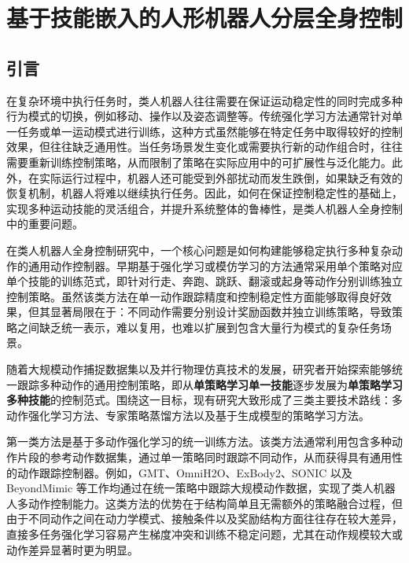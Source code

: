 
\chapter{基于技能嵌入的人形机器人分层全身控制}


\section{引言}
在复杂环境中执行任务时，类人机器人往往需要在保证运动稳定性的同时完成多种行为模式的切换，例如移动、操作以及姿态调整等。传统强化学习方法通常针对单一任务或单一运动模式进行训练，这种方式虽然能够在特定任务中取得较好的控制效果，但往往缺乏通用性\cite{duan2016benchmarking,heess2017emergence}。当任务场景发生变化或需要执行新的动作组合时，往往需要重新训练控制策略，从而限制了策略在实际应用中的可扩展性与泛化能力\cite{rusu2016progressive,hausman2018learning}。此外，在实际运行过程中，机器人还可能受到外部扰动而发生跌倒，如果缺乏有效的恢复机制，机器人将难以继续执行任务\cite{stephens2011push,fallon2015architecture}。因此，如何在保证控制稳定性的基础上，实现多种运动技能的灵活组合，并提升系统整体的鲁棒性，是类人机器人全身控制中的重要问题\cite{haarnoja2018soft,lynch2020learning}。



在类人机器人全身控制研究中，一个核心问题是如何构建能够稳定执行多种复杂动作的通用动作控制器。早期基于强化学习或模仿学习的方法通常采用单个策略对应单个技能的训练范式，即针对行走、奔跑、跳跃、翻滚或起身等动作分别训练独立控制策略\cite{peng2018deepmimic,heess2017emergence,hwangbo2019learning}。虽然该类方法在单一动作跟踪精度和控制稳定性方面能够取得良好效果，但其显著局限在于：不同动作需要分别设计奖励函数并独立训练策略，导致策略之间缺乏统一表示，难以复用，也难以扩展到包含大量行为模式的复杂任务场景。


随着大规模动作捕捉数据集以及并行物理仿真技术的发展，研究者开始探索能够统一跟踪多种动作的通用控制策略，即从\textbf{单策略学习单一技能}逐步发展为\textbf{单策略学习多种技能}的控制范式。围绕这一目标，现有研究大致形成了三类主要技术路线：多动作强化学习方法、专家策略蒸馏方法以及基于生成模型的策略学习方法。

第一类方法是基于多动作强化学习的统一训练方法。该类方法通常利用包含多种动作片段的参考动作数据集，通过单一策略同时跟踪不同动作，从而获得具有通用性的动作跟踪控制器。例如，GMT\cite{chen2025gmt}、OmniH2O\cite{he2024omnih2o}、ExBody2\cite{ji2024exbody2}、SONIC\cite{luo2025sonic} 以及 BeyondMimic\cite{liao2025beyondmimic} 等工作均通过在统一策略中跟踪大规模动作数据，实现了类人机器人多动作控制能力。这类方法的优势在于结构简单且无需额外的策略融合过程，但由于不同动作之间在动力学模式、接触条件以及奖励结构方面往往存在较大差异，直接多任务强化学习容易产生梯度冲突和训练不稳定问题，尤其在动作规模较大或动作差异显著时更为明显。

